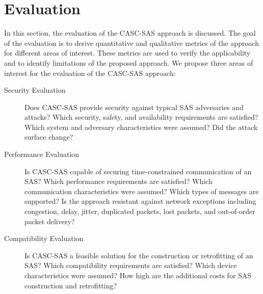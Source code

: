 \section{Evaluation}
\label{sec:approach:evaluation}
In this section, the evaluation of the CASC-SAS approach is discussed.
The goal of the evaluation is to derive quantitative and qualitative metrics of the approach for different areas of interest.
These metrics are used to verify the applicability and to identify limitations of the proposed approach.
We propose three areas of interest for the evaluation of the CASC-SAS approach:
\begin{description}
    \item[Security Evaluation] Does CASC-SAS provide security against typical SAS adversaries and attacks?
    Which security, safety, and availability requirements are satisfied?
    Which system and adversary characteristics were assumed?
    Did the attack surface change?
    \item[Performance Evaluation] Is CASC-SAS capable of securing time-constrained communication of an SAS?
    Which performance requirements are satisfied?
    Which communication characteristics were assumed?
    Which types of messages are supported?
    Is the approach resistant against network exceptions including congestion, delay, jitter, duplicated packets, lost packets, and out-of-order packet delivery?
    \item[Compatibility Evaluation] Is CASC-SAS a feasible solution for the construction or retrofitting of an SAS?
    Which compatibility requirements are satisfied?
    Which device characteristics were assumed?
    How high are the additional costs for SAS construction and retrofitting?
\end{description}

